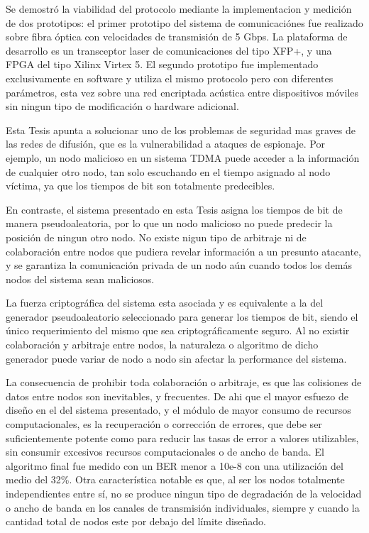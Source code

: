 
Se demostró la viabilidad del protocolo mediante la implementacion y medición de dos prototipos: el primer prototipo del sistema de comunicaciónes fue realizado sobre fibra óptica con velocidades de transmisión de 5 Gbps. La plataforma de desarrollo es un transceptor laser de comunicaciones del tipo XFP+, y una FPGA del tipo Xilinx Virtex 5.
El segundo prototipo fue implementado exclusivamente en software y utiliza el mismo protocolo pero con diferentes parámetros, esta vez sobre una red encriptada acústica entre dispositivos móviles sin ningun tipo de modificación o hardware adicional.

Esta Tesis apunta a solucionar uno de los problemas de seguridad mas graves de las redes de difusión, que es la vulnerabilidad a ataques de espionaje. Por ejemplo, un nodo malicioso en un sistema TDMA puede acceder a la información de cualquier otro nodo, tan solo escuchando en el tiempo asignado al nodo víctima, ya que los tiempos de bit son totalmente predecibles.  

En contraste, el sistema presentado en esta Tesis asigna los tiempos de bit de manera pseudoaleatoria, por lo que un nodo malicioso no puede predecir la posición de ningun otro nodo. No existe nigun tipo de arbitraje ni de colaboración entre nodos que pudiera revelar información a un presunto atacante, y se garantiza la comunicación privada de un nodo aún cuando todos los demás nodos del sistema sean maliciosos.

La fuerza criptográfica del sistema esta asociada y es equivalente a la del generador pseudoaleatorio seleccionado para generar los tiempos de bit, siendo el único requerimiento del mismo que sea criptográficamente seguro. Al no existir colaboración y arbitraje entre nodos, la naturaleza o algoritmo de dicho generador puede variar de nodo a nodo sin afectar la performance del sistema. 

La consecuencia de prohibir toda colaboración o arbitraje, es que las colisiones de datos entre nodos son inevitables, y frecuentes. De ahi que el mayor esfuezo de diseño en el del sistema presentado, y el módulo de mayor consumo de recursos computacionales, es la recuperación o corrección de errores, que debe ser suficientemente potente como para reducir las tasas de error a valores utilizables, sin consumir excesivos recursos computacionales o de ancho de banda. El algoritmo final fue medido con un BER menor a 10e-8 con una utilización del medio del 32\%. Otra característica notable es que, al ser los nodos totalmente independientes entre sí, no se produce ningun tipo de degradación de la velocidad o ancho de banda en los canales de transmisión individuales, siempre y cuando la cantidad total de nodos este por debajo del límite diseñado.


